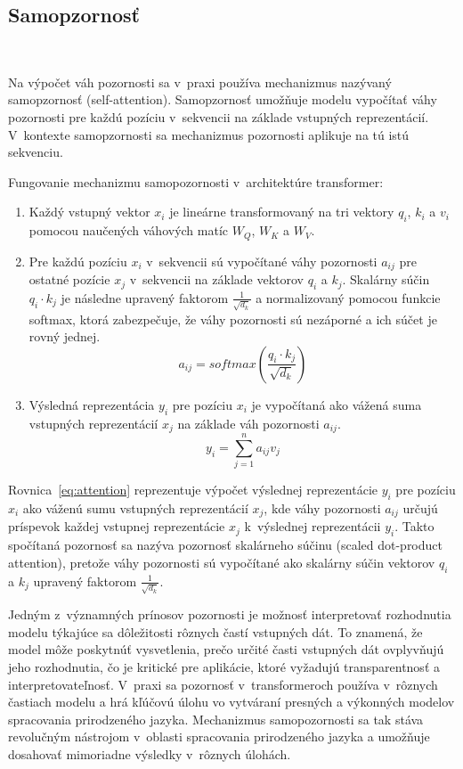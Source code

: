 \subsection{Samopzornosť}~\label{sec:self-attention}

Na výpočet váh pozornosti sa v~praxi používa mechanizmus nazývaný samopzornosť (self-attention). Samopzornosť umožňuje modelu vypočítať váhy pozornosti pre každú pozíciu v~sekvencii na základe vstupných reprezentácií. V~kontexte samopzornosti sa mechanizmus pozornosti aplikuje na tú istú sekvenciu.

\noindent Fungovanie mechanizmu samopozornosti v~architektúre transformer:
\begin{enumerate}
    \item Každý vstupný vektor $x_i$ je lineárne transformovaný na tri vektory $q_i$, $k_i$ a $v_i$ pomocou naučených váhových matíc $W_Q$, $W_K$ a $W_V$.
    \item Pre každú pozíciu $x_i$ v~sekvencii sú vypočítané váhy pozornosti $a_{ij}$ pre ostatné pozície $x_j$ v~sekvencii na základe vektorov $q_i$ a $k_j$. Skalárny súčin $q_i \cdot k_j$ je následne upravený faktorom $\frac{1}{\sqrt{d_k}}$ a normalizovaný pomocou funkcie softmax, ktorá zabezpečuje, že váhy pozornosti sú nezáporné a ich súčet je rovný jednej.
    \begin{equation}
        a_{ij} = softmax\left(\frac{q_i \cdot k_j}{\sqrt{d_k}}\right)
    \end{equation}
    \item Výsledná reprezentácia $y_i$ pre pozíciu $x_i$ je vypočítaná ako vážená suma vstupných reprezentácií $x_j$ na základe váh pozornosti $a_{ij}$.
    \begin{equation}\label{eq:attention}
        y_i = \sum_{j=1}^{n}a_{ij}v_j
    \end{equation}
\end{enumerate}

Rovnica~\ref{eq:attention} reprezentuje výpočet výslednej reprezentácie $y_i$ pre pozíciu $x_i$ ako váženú sumu vstupných reprezentácií $x_j$, kde váhy pozornosti $a_{ij}$ určujú príspevok každej vstupnej reprezentácie $x_j$ k~výslednej reprezentácii $y_i$. Takto spočítaná pozornosť sa nazýva pozornosť skalárneho súčinu (scaled dot-product attention), pretože váhy pozornosti sú vypočítané ako skalárny súčin vektorov $q_i$ a $k_j$ upravený faktorom $\frac{1}{\sqrt{d_k}}$.

Jedným z~významných prínosov pozornosti je možnosť interpretovať rozhodnutia modelu týkajúce sa dôležitosti rôznych častí vstupných dát. To znamená, že model môže poskytnúť vysvetlenia, prečo určité časti vstupných dát ovplyvňujú jeho rozhodnutia, čo je kritické pre aplikácie, ktoré vyžadujú transparentnosť a interpretovateľnosť. V~praxi sa pozornosť v~transformeroch používa v~rôznych častiach modelu a hrá kľúčovú úlohu vo vytváraní presných a výkonných modelov spracovania prirodzeného jazyka. Mechanizmus samopozornosti sa tak stáva revolučným nástrojom v~oblasti spracovania prirodzeného jazyka a umožňuje dosahovať mimoriadne výsledky v~rôznych úlohách.

